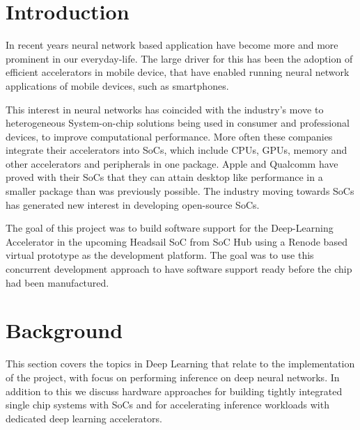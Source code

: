 \documentclass[12pt,a4paper,english
]{tunithesis}
\begin{document}
\if@twoside
\cleardoublepage
\fi


\renewcommand{\chaptername}{} %


\chapter{Introduction}
\label{ch:introduction}
\setcounter{page}{1} %

In recent years neural network based application have become more and more prominent in our everyday-life. The large driver for this has been the adoption of efficient accelerators in mobile device, that have enabled running neural network applications of mobile devices, such as smartphones.

This interest in neural networks has coincided with the industry's move to heterogeneous System-on-chip solutions being used in consumer and professional devices, to improve computational performance.
More often these companies integrate their accelerators into SoCs, which include CPUs, GPUs, memory and other accelerators and peripherals in one package. Apple and Qualcomm have proved with their SoCs that they can attain desktop like performance in a smaller package than was previously possible. The industry moving towards SoCs has generated new interest in developing open-source SoCs.

The goal of this project was to build software support for the Deep-Learning Accelerator in the upcoming Headsail SoC from SoC Hub using a Renode based virtual prototype as the development platform. The goal was to use this concurrent development approach to have software support ready before the chip had been manufactured.

\chapter{Background}
This section covers the topics in Deep Learning that relate to the implementation of the project, with focus on performing inference on deep neural networks. In addition to this we discuss hardware approaches for building tightly integrated single chip systems with SoCs and for accelerating inference workloads with dedicated deep learning accelerators.
\label{ch:background}
\end{document}
